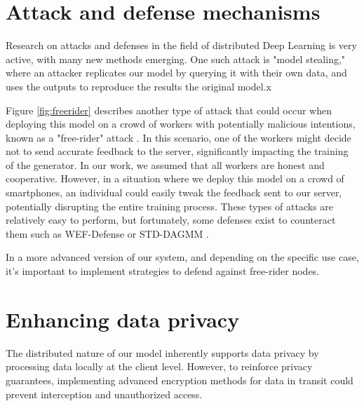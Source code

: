 


\section{Attack and defense mechanisms}

Research on attacks and defenses in the field of distributed Deep Learning is very active, with many new methods emerging. One such attack is "model stealing," where an attacker replicates our model by querying it with their own data, and uses the outputs to reproduce the results the original model.x

Figure \ref{fig:freerider} describes another type of attack that could occur when deploying this model on a crowd of workers with potentially malicious intentions, known as a "free-rider" attack \cite{fraboni2021freerider}. In this scenario, one of the workers might decide not to send accurate feedback to the server, significantly impacting the training of the generator. In our work, we assumed that all workers are honest and cooperative. However, in a situation where we deploy this model on a crowd of smartphones, an individual could easily tweak the feedback sent to our server, potentially disrupting the entire training process. These types of attacks are relatively easy to perform, but fortunately, some defenses exist to counteract them such as WEF-Defense \cite{chen2022rethinking} or STD-DAGMM \cite{fraboni2021freerider}.

In a more advanced version of our system, and depending on the specific use case, it's important to implement strategies to defend against free-rider nodes.



\section{Enhancing data privacy}
The distributed nature of our model inherently supports data privacy by processing data locally at the client level. However, to reinforce privacy guarantees, implementing advanced encryption methods for data in transit could prevent interception and unauthorized access. 

